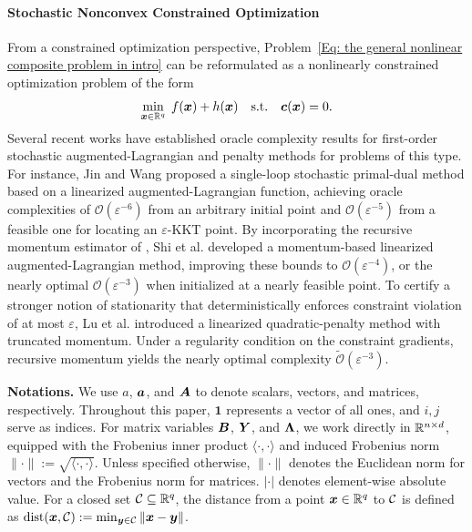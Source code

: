 \paragraph{Stochastic Nonconvex Constrained Optimization}
From a constrained optimization perspective, Problem~\eqref{Eq: the general nonlinear composite problem in intro} can be reformulated as a nonlinearly constrained optimization problem of the form
\[
  \min_{\bm{x} \in \mathbb{R}^{q}}\; f(\bm{x}) + h(\bm{x}) \quad \text{s.t.}\quad \bm{c}(\bm{x}) = 0.
\]
Several recent works have established oracle complexity results for first-order stochastic augmented-Lagrangian and penalty methods for problems of this type. For instance, Jin and Wang \cite{jin2022stochastic} proposed a single-loop stochastic primal-dual method based on a linearized augmented-Lagrangian function, achieving oracle complexities of $\mathcal{O}(\varepsilon^{-6})$ from an arbitrary initial point and $\mathcal{O}(\varepsilon^{-5})$ from a feasible one for locating an $\varepsilon$-KKT point. By incorporating the recursive momentum estimator of \cite{cutkoskyMomentumBasedVarianceReduction2019}, Shi et al. \cite{shi2025momentum} developed a momentum-based linearized augmented-Lagrangian method, improving these bounds to $\mathcal{O}(\varepsilon^{-4})$, or the nearly optimal $\mathcal{O}(\varepsilon^{-3})$ when initialized at a nearly feasible point. To certify a stronger notion of stationarity that deterministically enforces constraint violation of at most $\varepsilon$, Lu et al. \cite{lu2024variancereducedfirstordermethodsdeterministically} introduced a linearized quadratic-penalty method with truncated momentum. Under a regularity condition on the constraint gradients, recursive momentum yields the nearly optimal complexity $\widetilde{\mathcal{O}}(\varepsilon^{-3})$. 

\noindent\textbf{Notations.} We use $a$, $\bm{a}$, and $\bm{A}$ to denote scalars, vectors, and matrices, respectively. Throughout this paper, $\bm{1}$ represents a vector of all ones, and $i, j$ serve as indices. For matrix variables \(\bm{B}\), \(\bm{Y}\), and \(\bm{\Lambda}\), we work directly in \(\mathbb{R}^{n \times d}\), equipped with the Frobenius inner product \(\langle \cdot, \cdot \rangle\) and induced Frobenius norm \(\| \cdot \| := \sqrt{\langle \cdot, \cdot \rangle}\). Unless specified otherwise, \(\| \cdot \|\) denotes the Euclidean norm for vectors and the Frobenius norm for matrices. \( |\cdot| \) denotes element-wise absolute value. For a closed set \(\mathcal{C} \subseteq \mathbb{R}^{q}\), the distance from a point \(\bm{x} \in \mathbb{R}^{q}\) to \(\mathcal{C}\) is defined as \(\text{dist}(\bm{x}, \mathcal{C}) := \min_{\bm{y} \in \mathcal{C}}\|\bm{x} - \bm{y}\|\).
